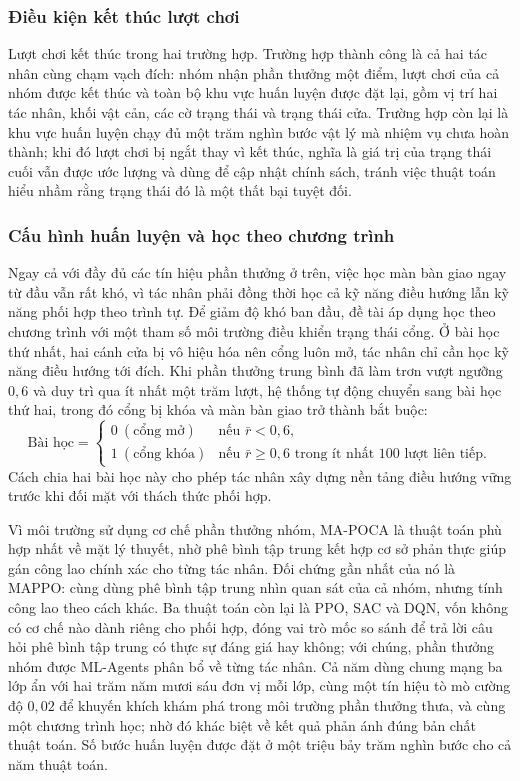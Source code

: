 \subsubsection{Điều kiện kết thúc lượt chơi}
\indent Lượt chơi kết thúc trong hai trường hợp. Trường hợp thành công là cả hai tác
nhân cùng chạm vạch đích: nhóm nhận phần thưởng một điểm, lượt chơi của cả nhóm được
kết thúc và toàn bộ khu vực huấn luyện được đặt lại, gồm vị trí hai tác nhân, khối vật
cản, các cờ trạng thái và trạng thái cửa. Trường hợp còn lại là khu vực huấn luyện chạy
đủ một trăm nghìn bước vật lý mà nhiệm vụ chưa hoàn thành; khi đó lượt chơi bị ngắt
thay vì kết thúc, nghĩa là giá trị của trạng thái cuối vẫn được ước lượng và dùng để
cập nhật chính sách, tránh việc thuật toán hiểu nhầm rằng trạng thái đó là một thất bại
tuyệt đối.

\subsubsection{Cấu hình huấn luyện và học theo chương trình}
\label{sub:coop-curriculum}
\indent Ngay cả với đầy đủ các tín hiệu phần thưởng ở trên, việc học màn bàn giao ngay
từ đầu vẫn rất khó, vì tác nhân phải đồng thời học cả kỹ năng điều hướng lẫn kỹ năng
phối hợp theo trình tự. Để giảm độ khó ban đầu, đề tài áp dụng học theo chương trình
với một tham số môi trường điều khiển trạng thái cổng. Ở bài học thứ nhất, hai cánh cửa
bị vô hiệu hóa nên cổng luôn mở, tác nhân chỉ cần học kỹ năng điều hướng tới đích. Khi
phần thưởng trung bình đã làm trơn vượt ngưỡng $0{,}6$ và duy trì qua ít nhất một trăm
lượt, hệ thống tự động chuyển sang bài học thứ hai, trong đó cổng bị khóa và màn bàn
giao trở thành bắt buộc:
\begin{equation}
\text{Bài học} =
\begin{cases}
0 \ (\text{cổng mở}) & \text{nếu } \bar{r} < 0{,}6, \\[2pt]
1 \ (\text{cổng khóa}) & \text{nếu } \bar{r} \ge 0{,}6 \text{ trong ít nhất } 100
\text{ lượt liên tiếp}.
\end{cases}
\end{equation}
Cách chia hai bài học này cho phép tác nhân xây dựng nền tảng điều hướng vững trước khi
đối mặt với thách thức phối hợp.

\indent Vì môi trường sử dụng cơ chế phần thưởng nhóm, MA-POCA là thuật toán phù hợp
nhất về mặt lý thuyết, nhờ phê bình tập trung kết hợp cơ sở phản thực giúp gán công lao
chính xác cho từng tác nhân. Đối chứng gần nhất của nó là MAPPO: cùng dùng phê
bình tập trung nhìn quan sát của cả nhóm, nhưng tính công lao theo cách khác. Ba thuật
toán còn lại là PPO, SAC và DQN, vốn không có cơ chế nào dành riêng cho phối hợp, đóng
vai trò mốc so sánh để trả lời câu hỏi phê bình tập trung có thực sự đáng giá hay không;
với chúng, phần thưởng nhóm được ML-Agents phân bổ về từng tác nhân. Cả năm
dùng chung mạng ba lớp ẩn với hai trăm năm mươi sáu đơn vị mỗi lớp, cùng một tín hiệu
tò mò cường độ $0{,}02$ để khuyến khích khám phá trong môi trường phần thưởng thưa, và
cùng một chương trình học; nhờ đó khác biệt về kết quả phản ánh đúng bản chất thuật
toán. Số bước huấn luyện được đặt ở một triệu bảy trăm nghìn bước cho cả năm thuật toán.

